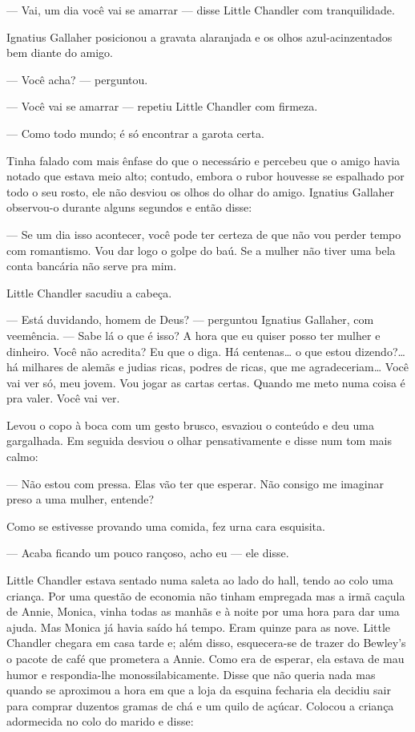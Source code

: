 --- Vai, um dia você vai se amarrar --- disse Little Chandler com
tranquilidade.

Ignatius Gallaher posicionou a gravata alaranjada e os olhos
azul-acinzentados bem diante do amigo.

--- Você acha? --- perguntou.

--- Você vai se amarrar --- repetiu Little Chandler com firmeza.

--- Como todo mundo; é só encontrar a garota certa.

Tinha falado com mais ênfase do que o necessário e percebeu que o
amigo havia notado que estava meio alto; contudo, embora o rubor
houvesse se espalhado por todo o seu rosto, ele não
desviou os olhos do olhar do amigo. Ignatius Gallaher observou-o
durante alguns segundos e então disse:

--- Se um dia isso acontecer, você pode ter certeza de que não vou
perder tempo com romantismo. Vou dar logo o golpe do baú. Se a mulher
não tiver uma bela conta bancária não serve pra mim.

Little Chandler sacudiu a cabeça.

--- Está duvidando, homem de Deus? --- perguntou Ignatius Gallaher,
com veemência. --- Sabe lá o que é isso? A hora que eu quiser posso
ter mulher e dinheiro. Você não acredita? Eu que o diga. Há
centenas\ldots{} o que estou dizendo?\ldots{} há milhares de alemãs e judias ricas,
podres de ricas, que me agradeceriam\ldots{} Você vai ver só, meu jovem.
Vou jogar as cartas certas. Quando me meto numa coisa é pra valer.
Você vai ver.

Levou o copo à boca com um gesto brusco, esvaziou o conteúdo e deu
uma gargalhada. Em seguida desviou o olhar pensativamente e disse
num tom mais calmo:

--- Não estou com pressa. Elas vão ter que esperar. Não consigo me
imaginar preso a uma mulher, entende?

Como se estivesse provando uma comida, fez urna cara esquisita.

--- Acaba ficando um pouco rançoso, acho eu --- ele disse.

\dotfill\hspace{.7\textwidth}

Little Chandler estava sentado numa saleta ao lado do hall, tendo ao
colo uma criança. Por uma questão de economia não tinham empregada
mas a irmã caçula de Annie, Monica, vinha todas as manhãs e à noite
por uma hora para dar uma ajuda. Mas Monica já havia saído há tempo.
Eram quinze para as nove. Little Chandler chegara em casa tarde e;
além disso, esquecera-se de trazer do Bewley's o pacote de café que
prometera a Annie. Como era de esperar, ela estava de mau humor e
respondia-lhe monossilabicamente. Disse que não queria nada mas
quando se aproximou a hora em que a loja da esquina fecharia ela
decidiu sair para comprar duzentos gramas de chá e um quilo de açúcar.
Colocou a criança adormecida no colo do marido e disse:

